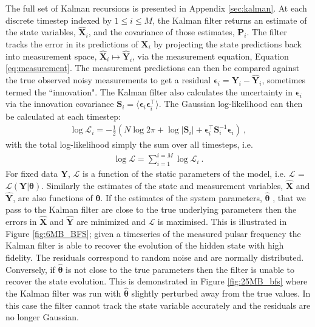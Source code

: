 \documentclass[fleqn,usenatbib,useAMS]{mnras}
\begin{document}
The full set of Kalman recursions is presented in Appendix \ref{sec:kalman}. At each discrete timestep indexed by $ 1 \leq i  \leq M$, the Kalman filter returns an estimate of the state variables, $\hat{\boldsymbol{X}}_i$, and the covariance of those estimates, $\boldsymbol{P}_i$. The filter tracks the error in its predictions of $\boldsymbol{X}_i$ by projecting the state predictions back into measurement space, $\hat{\boldsymbol{X}}_i \mapsto \hat{\boldsymbol{Y}}_i$, via the measurement equation, Equation \eqref{eq:measurement}. The measurement predictions can then be compared against the true observed noisy measurements to get a residual $\boldsymbol{\epsilon}_i = \boldsymbol{Y}_i  - \hat{\boldsymbol{Y}}_i$, sometimes termed the ``innovation". The Kalman filter also calculates the uncertainty in $\boldsymbol{\epsilon}_i$ via the innovation covariance $\boldsymbol{S}_i = \langle \boldsymbol{\epsilon}_i \boldsymbol{\epsilon}_i^{\intercal} \rangle$. The Gaussian log-likelihood can then be calculated at each timestep:
\begin{eqnarray}
	\log \mathcal{L}_i =  -\frac{1}{2} \left (N \log 2 \pi + \log  \left | \boldsymbol{S}_i \right | + \boldsymbol{\epsilon}_i^{\intercal} \boldsymbol{S}_i^{-1}  \boldsymbol{\epsilon}_i \right ) \ ,
\end{eqnarray}
with the total log-likelihood simply the sum over all timesteps, i.e. 
\begin{eqnarray}
	\log \mathcal{L} =  \sum_{i=1}^{i=M} \log \mathcal{L}_i \ . \label{eq:likelihood}
\end{eqnarray}
For fixed data $\boldsymbol{Y}$, $\mathcal{L}$ is a function of the static parameters of the model, i.e. $\mathcal{L}$ = $\mathcal{L}(\boldsymbol{Y} | \boldsymbol{\theta})$. Similarly the estimates of the state and measurement variables, $\hat{\boldsymbol{X}}$ and $\hat{\boldsymbol{Y}}$, are also functions of $\boldsymbol{\theta}$. If the estimates of the system parameters, $\boldsymbol{\hat{\theta}}$ , that we pass to the Kalman filter are close to the true underlying parameters then the errors in $\hat{\boldsymbol{X}}$ and $\hat{\boldsymbol{Y}}$ are	 minimized and $\mathcal{L}$ is maximised. This is illustrated in Figure \ref{fig:6MB_BFS}; given a timeseries of the measured pulsar frequency the Kalman filter is able to recover the evolution of the hidden state with high fidelity. The residuals correspond to random noise and are normally distributed. Conversely, if $\boldsymbol{\hat{\theta}}$ is not close to the true parameters then the filter is unable to recover the state evolution. This is demonstrated in Figure \ref{fig:25MB_bfs} where the Kalman filter was run with $\boldsymbol{\hat{\theta}}$ slightly perturbed away from the true values. In this case the filter cannot track the state variable accurately and the residuals are no longer Gaussian.
\end{document}
